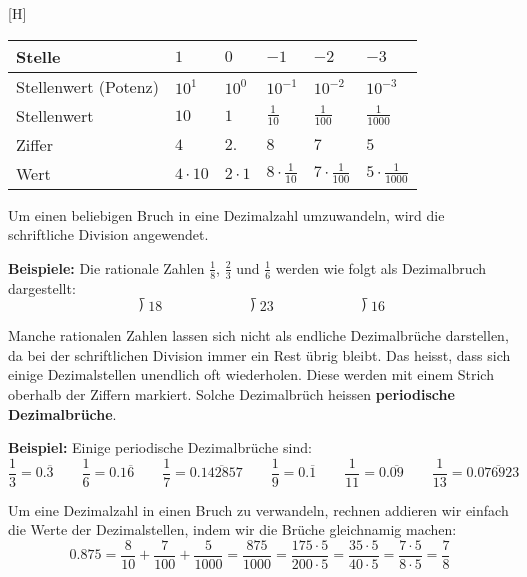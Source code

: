 \begin{center}[H]
  \renewcommand{\arraystretch}{1.3}
  \begin{tabularx}{0.9\textwidth}{lCCCCC}
  \toprule
    Stelle & $1$ & $0$ & $-1$ & $-2$ & $-3$ \\
  \midrule
    Stellenwert (Potenz) & $10^{1}$ & $10^{0}$ & $10^{-1}$ & $10^{-2}$ & $10^{-3}$ \\
  \midrule
    Stellenwert & $10$ & $1$ & $\frac{1}{10}$ & $\frac{1}{100}$ & $\frac{1}{1000}$ \\
  \midrule
    Ziffer & $4$ & $2.$ & $8$ & $7$ & $5$ \\
  \midrule
    Wert & $4\cdot 10$ & $2\cdot 1$ & $8\cdot\frac{1}{10}$ & $7\cdot\frac{1}{100}$ & $5\cdot\frac{1}{1000}$ \\
  \bottomrule
  \end{tabularx}
\end{center}

Um einen beliebigen Bruch in eine Dezimalzahl umzuwandeln, wird die schriftliche Division angewendet.
\begin{example}
  \textbf{Beispiele:} Die rationale Zahlen $\frac{1}{8}$, $\frac{2}{3}$ und $\frac{1}{6}$ werden wie folgt als Dezimalbruch dargestellt:
  \[
    \longdivision{1}{8} \qquad\qquad\qquad \longdivision{2}{3} \qquad\qquad\qquad \longdivision{1}{6}
  \]
\end{example}

Manche rationalen Zahlen lassen sich nicht als endliche Dezimalbrüche darstellen, da bei der schriftlichen Division immer ein Rest übrig bleibt. Das heisst, dass sich einige Dezimalstellen unendlich oft wiederholen. Diese werden mit einem Strich oberhalb der Ziffern markiert. Solche Dezimalbrüch heissen \textbf{periodische Dezimalbrüche}.

\begin{example}
  \textbf{Beispiel:} Einige periodische Dezimalbrüche sind:
  \[
    \frac{1}{3} = 0.\overline{3} \qquad
    \frac{1}{6} = 0.1\overline{6} \qquad
    \frac{1}{7} = 0.\overline{142857} \qquad
    \frac{1}{9} = 0.\overline{1} \qquad
    \frac{1}{11} = 0.\overline{09} \qquad
    \frac{1}{13} = 0.\overline{076923}
  \]
\end{example}

Um eine Dezimalzahl in einen Bruch zu verwandeln, rechnen addieren wir einfach die Werte der Dezimalstellen, indem wir die Brüche gleichnamig machen:
\[
  0.875 = \frac{8}{10} + \frac{7}{100} + \frac{5}{1000} = \frac{875}{1000} =\frac{175\cdot 5}{200\cdot 5} = \frac{35\cdot 5}{40\cdot 5} = \frac{7\cdot 5}{8\cdot 5} = \frac{7}{8}
\]
